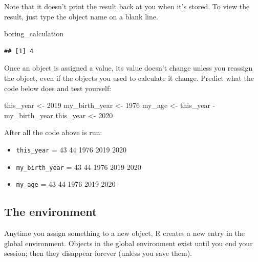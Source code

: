 \documentclass[
  oneside]{book}
\newenvironment{Shaded}{\begin{snugshade}}{\end{snugshade}}
\newcommand{\DecValTok}[1]{\textcolor[rgb]{0.00,0.00,0.81}{#1}}
\newcommand{\NormalTok}[1]{#1}
\newcommand{\OtherTok}[1]{\textcolor[rgb]{0.56,0.35,0.01}{#1}}
\newcommand{\SpecialCharTok}[1]{\textcolor[rgb]{0.00,0.00,0.00}{#1}}
\providecommand{\tightlist}{%
  \setlength{\itemsep}{0pt}\setlength{\parskip}{0pt}}
\begin{document}
Note that it doesn't print the result back at you when it's stored. To view the result, just type the object name on a blank line.

\begin{Shaded}
\begin{Highlighting}[]
\NormalTok{boring\_calculation}
\end{Highlighting}
\end{Shaded}

\begin{verbatim}
## [1] 4
\end{verbatim}

Once an object is assigned a value, its value doesn't change unless you reassign the object, even if the objects you used to calculate it change. Predict what the code below does and test yourself:

\begin{Shaded}
\begin{Highlighting}[]
\NormalTok{this\_year }\OtherTok{\textless{}{-}} \DecValTok{2019}
\NormalTok{my\_birth\_year }\OtherTok{\textless{}{-}} \DecValTok{1976}
\NormalTok{my\_age }\OtherTok{\textless{}{-}}\NormalTok{ this\_year }\SpecialCharTok{{-}}\NormalTok{ my\_birth\_year}
\NormalTok{this\_year }\OtherTok{\textless{}{-}} \DecValTok{2020}
\end{Highlighting}
\end{Shaded}

\begin{try}

After all the code above is run:

\begin{itemize}
\tightlist
\item
  \texttt{this\_year} = 43 44 1976 2019 2020
\item
  \texttt{my\_birth\_year} = 43 44 1976 2019 2020
\item
  \texttt{my\_age} = 43 44 1976 2019 2020
\end{itemize}

\end{try}

\hypertarget{the-environment}{%
\subsection{The environment}\label{the-environment}}

Anytime you assign something to a new object, R creates a new entry in the global environment. Objects in the global environment exist until you end your session; then they disappear forever (unless you save them).
\end{document}
